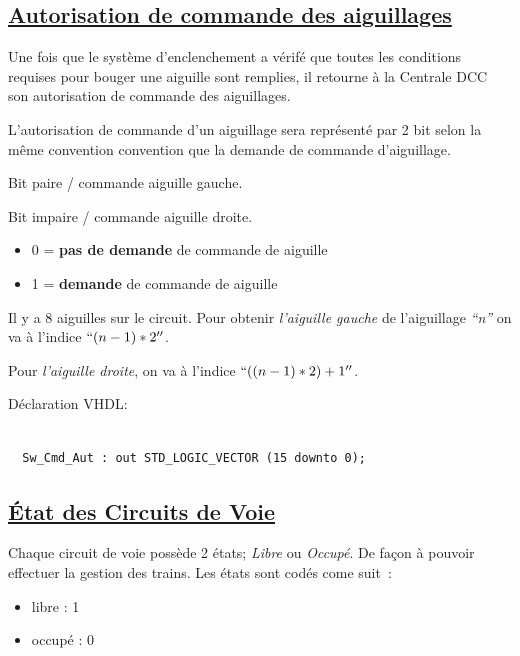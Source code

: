 \subsection{\underline{Autorisation de commande des aiguillages}}
\label{sec:ixl_dem_aig}

Une fois que le système d'enclenchement a vérifé que toutes les
conditions requises pour bouger une aiguille sont remplies, il 
retourne à la Centrale DCC son autorisation de commande des aiguillages.

L'autorisation de commande d'un aiguillage sera représenté par
2 bit selon la même convention convention que la demande de commande
d'aiguillage.

Bit paire / commande aiguille gauche.

Bit impaire / commande aiguille droite.

\medskip

\begin{itemize}
\item 0 = \textbf{pas de demande} de commande de aiguille
\item 1 = \textbf{demande} de commande de aiguille
\end{itemize}

\medskip


Il y a 8 aiguilles sur le circuit. Pour obtenir \emph{l'aiguille gauche} de
l'aiguillage \emph{``n''} on va à l'indice $``(n-1)*2''$.

Pour \emph{l'aiguille droite}, on va à l'indice $``((n-1)*2) + 1''$.

\bigskip

Déclaration VHDL:
\begin{lstlisting}[style=vhdl]

  Sw_Cmd_Aut : out STD_LOGIC_VECTOR (15 downto 0);

\end{lstlisting}

\newpage
  
\subsection{\underline{\'Etat des Circuits de Voie}}
\label{sec:st_sig}

Chaque circuit de voie possède 2 états; \emph{Libre} ou
\emph{Occupé}. De façon à pouvoir effectuer la gestion des trains.
Les états sont codés come suit~:
\begin{itemize}
  \item libre : 1
  \item occupé : 0
\end{itemize}  

